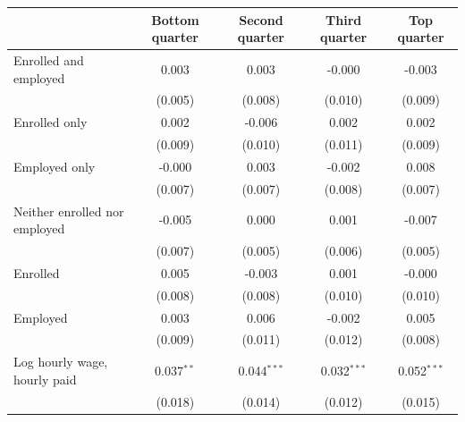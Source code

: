 \begin{tabular}{lcccc}
\toprule
 & Bottom quarter & Second quarter & Third quarter & Top quarter \\
\midrule
Enrolled and employed & 0.003 & 0.003 & -0.000 & -0.003 \\
 & (0.005) & (0.008) & (0.010) & (0.009) \\
Enrolled only & 0.002 & -0.006 & 0.002 & 0.002 \\
 & (0.009) & (0.010) & (0.011) & (0.009) \\
Employed only & -0.000 & 0.003 & -0.002 & 0.008 \\
 & (0.007) & (0.007) & (0.008) & (0.007) \\
Neither enrolled nor employed & -0.005 & 0.000 & 0.001 & -0.007 \\
 & (0.007) & (0.005) & (0.006) & (0.005) \\
Enrolled & 0.005 & -0.003 & 0.001 & -0.000 \\
 & (0.008) & (0.008) & (0.010) & (0.010) \\
Employed & 0.003 & 0.006 & -0.002 & 0.005 \\
 & (0.009) & (0.011) & (0.012) & (0.008) \\
Log hourly wage, hourly paid & 0.037$^{**}$ & 0.044$^{***}$ & 0.032$^{***}$ & 0.052$^{***}$ \\
 & (0.018) & (0.014) & (0.012) & (0.015) \\
\bottomrule
\end{tabular}
